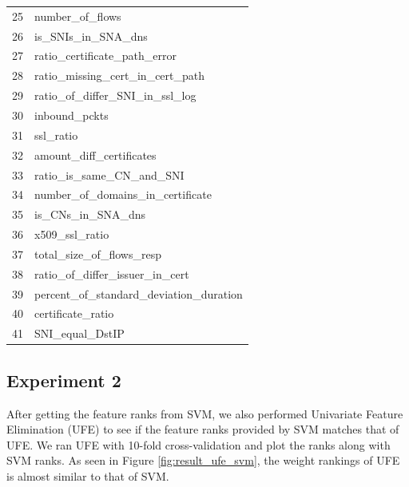 \begin{table}[!htb]
\begin{center}
\begin{tabular}{c|p{}}
			 25 & number\_of\_flows                          \\
			 26 & is\_SNIs\_in\_SNA\_dns                     \\
			 27 & ratio\_certificate\_path\_error            \\
			 28 & ratio\_missing\_cert\_in\_cert\_path       \\
			 29 & ratio\_of\_differ\_SNI\_in\_ssl\_log       \\
			 30 & inbound\_pckts                             \\
			 31 & ssl\_ratio                                 \\
			 32 & amount\_diff\_certificates                 \\
			 33 & ratio\_is\_same\_CN\_and\_SNI              \\
			 34 & number\_of\_domains\_in\_certificate       \\
			 35 & is\_CNs\_in\_SNA\_dns                      \\
			 36 & x509\_ssl\_ratio                           \\
			 37 & total\_size\_of\_flows\_resp               \\
			 38 & ratio\_of\_differ\_issuer\_in\_cert        \\
			 39 & percent\_of\_standard\_deviation\_duration \\
			 40 & certificate\_ratio                         \\
			 41 & SNI\_equal\_DstIP                        \\ \hline
		\end{tabular}
	\end{center}
\end{table}

\clearpage

\subsection{Experiment 2}

After getting the feature ranks from SVM, we also performed Univariate Feature Elimination (UFE) to see if the feature ranks provided by SVM matches that of UFE. We ran UFE with 10-fold cross-validation and plot the ranks along with SVM ranks. As seen in Figure \ref{fig:result_ufe_svm}, the weight rankings of UFE is almost similar to that of SVM.

